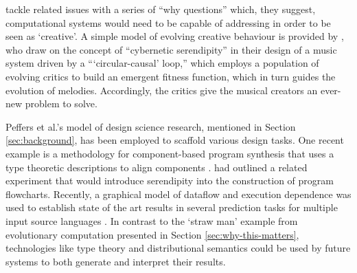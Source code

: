 \citet{gucklesberger2017addressing} tackle related issues with a
series of ``why questions'' which, they suggest, computational systems
would need to be capable of addressing in order to be seen as
`creative'.  A simple model of evolving creative behaviour is provided
by \citet{loughran2018serendipity}, who draw on the concept of
``cybernetic serendipity'' in their design of a music system driven by
a {``}`circular-causal' loop,{''} which employs a population of
evolving critics to build an emergent fitness function, which in turn
guides the evolution of melodies.  Accordingly, the critics give the
musical creators an ever-new problem to solve.

Peffers et al.'s model of design science research, mentioned in
Section \ref{sec:background}, has been employed to scaffold various
design tasks.  One recent example is a methodology for component-based
program synthesis that uses a type theoretic descriptions to align
components \cite{10.1007/978-3-030-03427-6_35}.
\citet{pease2013discussion} had outlined a related experiment that
would introduce serendipity into the construction of program
flowcharts.  Recently, a graphical model of dataflow and execution
dependence was used to establish state of the art results in several
prediction tasks for multiple input source languages
\cite{NIPS2018_7617}.  In contrast to the `straw man' example from
evolutionary computation presented in Section
\ref{sec:why-this-matters}, technologies like type theory and
distributional semantics \cite{DBLP:journals/corr/abs-1803-09473}
could be used by future systems to both generate and interpret their
results.

